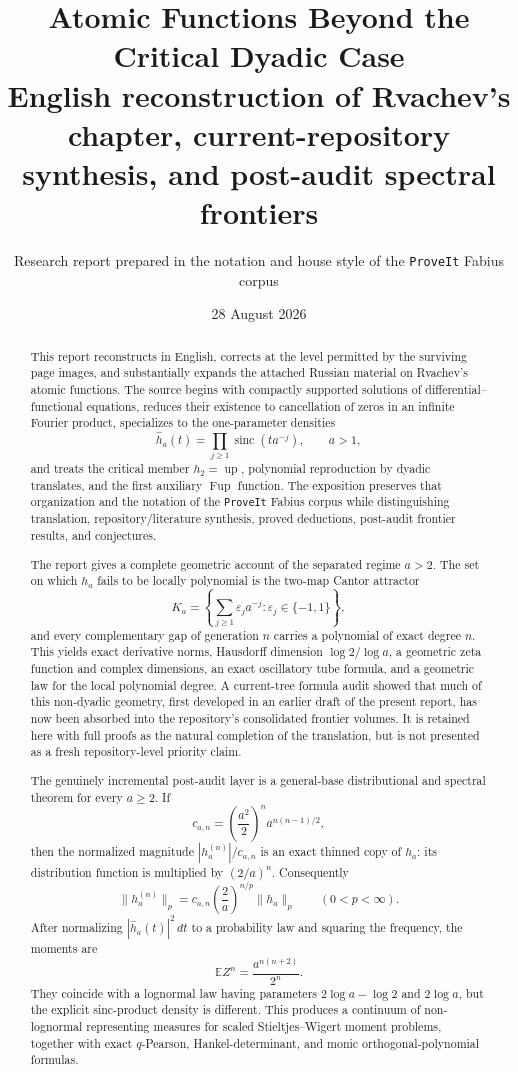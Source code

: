 \documentclass[11pt,oneside]{article}
\title{\bfseries Atomic Functions Beyond the Critical Dyadic Case\\[0.35em]
\large English reconstruction of Rvachev's chapter, current-repository synthesis, and post-audit spectral frontiers}
\author{Research report prepared in the notation and house style of the \texttt{ProveIt} Fabius corpus}
\date{28 August 2026}
\theoremstyle{definition}
\theoremstyle{remark}
\newcommand{\Up}{\operatorname{up}}
\newcommand{\sinc}{\operatorname{sinc}}
\newcommand{\eps}{\varepsilon}
\begin{document}
\maketitle

\begin{abstract}
This report reconstructs in English, corrects at the level permitted by the surviving page images, and substantially expands the attached Russian material on Rvachev's atomic functions.  The source begins with compactly supported solutions of differential--functional equations, reduces their existence to cancellation of zeros in an infinite Fourier product, specializes to the one-parameter densities
\[
 \widehat h_a(t)=\prod_{j\ge1}\sinc(t a^{-j}),\qquad a>1,
\]
and treats the critical member $h_2=\Up$, polynomial reproduction by dyadic translates, and the first auxiliary $\operatorname{Fup}$ function.  The exposition preserves that organization and the notation of the \texttt{ProveIt} Fabius corpus while distinguishing translation, repository/literature synthesis, proved deductions, post-audit frontier results, and conjectures.

The report gives a complete geometric account of the separated regime $a>2$.  The set on which $h_a$ fails to be locally polynomial is the two-map Cantor attractor
\[
 K_a=\left\{\sum_{j\ge1}\eps_j a^{-j}:\eps_j\in\{-1,1\}\right\},
\]
and every complementary gap of generation $n$ carries a polynomial of exact degree $n$.  This yields exact derivative norms, Hausdorff dimension $\log2/\log a$, a geometric zeta function and complex dimensions, an exact oscillatory tube formula, and a geometric law for the local polynomial degree.  A current-tree formula audit showed that much of this non-dyadic geometry, first developed in an earlier draft of the present report, has now been absorbed into the repository's consolidated frontier volumes.  It is retained here with full proofs as the natural completion of the translation, but is not presented as a fresh repository-level priority claim.

The genuinely incremental post-audit layer is a general-base distributional and spectral theorem for every $a\ge2$.  If
\[
 c_{a,n}=\left(\frac{a^2}{2}\right)^n a^{n(n-1)/2},
\]
then the normalized magnitude $|h_a^{(n)}|/c_{a,n}$ is an exact thinned copy of $h_a$: its distribution function is multiplied by $(2/a)^n$.  Consequently
\[
 \|h_a^{(n)}\|_p=c_{a,n}\left(\frac2a\right)^{n/p}\|h_a\|_p
 \qquad(0<p<\infty).
\]
After normalizing $|\widehat h_a(t)|^2\,dt$ to a probability law and squaring the frequency, the moments are
\[
 \mathbb E Z^n=\frac{a^{n(n+2)}}{2^n}.
\]
They coincide with a lognormal law having parameters $2\log a-\log2$ and $2\log a$, but the explicit sinc-product density is different.  This produces a continuum of non-lognormal representing measures for scaled Stieltjes--Wigert moment problems, together with exact $q$-Pearson, Hankel-determinant, and monic orthogonal-polynomial formulas.


\end{abstract}
\end{document}
